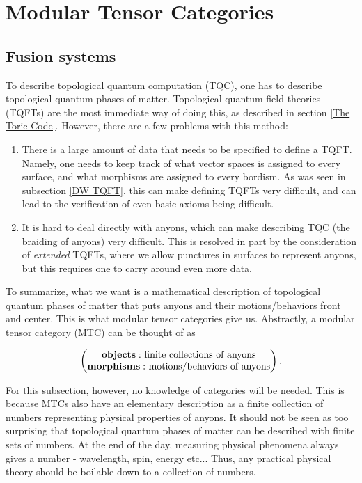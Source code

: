 \documentclass{article}
\theoremstyle{definition}
\numberwithin{figure}{section}
\begin{document}
\section{Modular Tensor Categories}
\label{Modular Tensor Categories}

\subsection{Fusion systems}
\label{Fusion systems}

To describe topological quantum computation (TQC), one has to describe topological quantum phases of matter. Topological quantum field theories (TQFTs) are the most immediate way of doing this, as described in section \ref{The Toric Code}. However, there are a few problems with this method:

\begin{enumerate}
\item There is a large amount of data that needs to be specified to define a TQFT. Namely, one needs to keep track of what vector spaces is assigned to every surface, and what morphisms are assigned to every bordism. As was seen in subsection \ref{DW TQFT}, this can make defining TQFTs very difficult, and can lead to the verification of even basic axioms being difficult.

\item It is hard to deal directly with anyons, which can make describing TQC (the braiding of anyons) very difficult. This is resolved in part by the consideration of \textit{extended} TQFTs, where we allow punctures in surfaces to represent anyons, but this requires one to carry around even more data.
\end{enumerate}

To summarize, what we want is a mathematical description of topological quantum phases of matter that puts anyons and their motions/behaviors front and center. This is what modular tensor categories give us. Abstractly, a modular tensor category (MTC) can be thought of as

$$
\begin{pmatrix}
\bold{objects:}\text{ finite collections of anyons} \\
\bold{morphisms:}\text{ motions/behaviors of anyons}
\end{pmatrix}.
$$

For this subsection, however, no knowledge of categories will be needed. This is because MTCs also have an elementary description as a finite collection of numbers representing physical properties of anyons. It should not be seen as too surprising that topological quantum phases of matter can be described with finite sets of numbers. At the end of the day, measuring physical phenomena always gives a number - wavelength, spin, energy etc... Thus, any practical physical theory should be boilable down to a collection of numbers.
\end{document}
